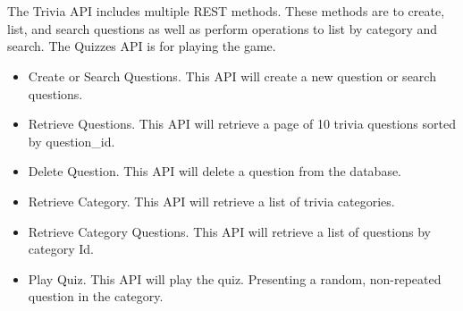 \documentclass[letterpaper,10pt,english]{sphinxmanual}
\begin{document}
\section{}
\label{\detokenize{index:introduction}}
The Trivia API includes multiple REST methods. 
These methods are to create, list, and search questions as well as perform operations
to list by category and search. The Quizzes API is for playing the game.
\begin{itemize}
\item {} 
Create or Search Questions. This API will create a new question or search questions.

\item {} 
Retrieve Questions. This API will retrieve a page of 10 trivia questions sorted by question\_id.

\item {} 
Delete Question. This API will delete a question from the database.

\item {} 
Retrieve Category. This API will retrieve a list of trivia categories.

\item {} 
Retrieve Category Questions. This API will retrieve a list of questions by category Id.

\item {} 
Play Quiz. This API will play the quiz. Presenting a random, non-repeated question in the category.

\end{itemize}
\end{document}
